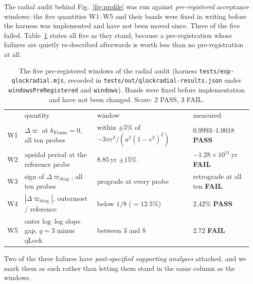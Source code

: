 \documentclass[aps,reprint,amsmath,amssymb,nofootinbib,superscriptaddress,floatfix]{revtex4-2}
\begin{document}
The radial audit behind Fig.~\ref{fig:profile} was run against
\emph{pre-registered} acceptance windows: the five quantities W1--W5 and
their bands were fixed in writing before the harness was implemented and
have not been moved since.
Three of the five failed.
Table~\ref{tab:w15} states all five as they stand, because a
pre-registration whose failures are quietly re-described afterwards is
worth less than no pre-registration at all.

\begin{table}[t]
\caption{The five pre-registered windows of the radial audit (harness
  \texttt{tests/exp-qlockradial.mjs}, recorded in
  \texttt{tests/out/qlockradial-results.json} under
  \texttt{windowsPreRegistered} and \texttt{windows}). Bands were fixed
  before implementation and have not been changed. Score: 2 PASS,
  3 FAIL.}
\label{tab:w15}
\begin{ruledtabular}
\setlength{\tabcolsep}{2pt}
\begin{tabular}{@{}lp{}p{}p{}@{}}
 & quantity & window & measured \\
\colrule
W1 & $\Delta\varpi$ at $k_{\mathrm{Frame}}{=}0$, all ten probes &
  within $\pm5\%$ of $-3\pi\varepsilon^{2}/(a^{2}(1-e^{2})^{2})$ &
  $0.9993$--$1.0018$ \textbf{PASS} \\
W2 & apsidal period at the reference probe & $8.85$\,yr $\pm15\%$ &
  $-1.28\times10^{11}$\,yr \textbf{FAIL} \\
W3 & sign of $\Delta\varpi_{\mathrm{drag}}$, all ten probes &
  prograde at every probe &
  retrograde at all ten \textbf{FAIL} \\
W4 & $|\Delta\varpi_{\mathrm{drag}}|$, outermost / reference &
  below $1/8$ ($=12.5\%$) & $2.42\%$ \textbf{PASS} \\
W5 & outer log--log slope gap, $q{=}3$ minus qLock &
  between $3$ and $8$ & $2.72$ \textbf{FAIL} \\
\end{tabular}
\end{ruledtabular}
\end{table}

Two of the three failures have \emph{post-specified supporting
analyses} attached, and we mark them as such rather than letting them
stand in the same column as the windows.
\end{document}
